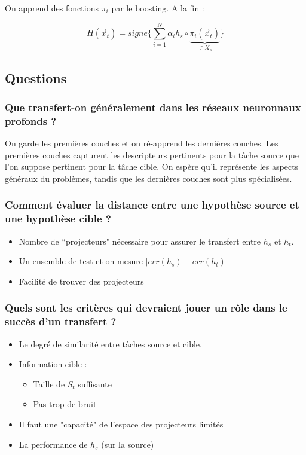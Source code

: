 \documentclass{article}
\begin{document}
On apprend des fonctions $\pi_i$ par le boosting. A la fin :

$$ H(\vec{x}_t) = signe \bigg\{ \sum_{i=1}^N \alpha_i h_s \circ \underbrace{\pi_i(\vec{x}_t)}_{\in X_s} \bigg\} $$

\subsection{Questions}

\subsubsection*{Que transfert-on généralement dans les réseaux neuronnaux profonds ?}

On garde les premières couches et on ré-apprend les dernières couches. Les premières couches capturent les descripteurs pertinents pour la tâche source que l'on suppose pertinent pour la tâche cible. On espère qu'il représente les aspects généraux du problèmes, tandis que les dernières couches sont plus spécialisées.

\subsubsection*{Comment évaluer la distance entre une hypothèse source et une hypothèse cible ?}
\begin{itemize}
\item Nombre de ``projecteurs" nécessaire pour assurer le transfert entre $h_s$ et $h_t$.
\item Un ensemble de test et on mesure $|err(h_s) - err(h_t)|$
\item Facilité de trouver des projecteurs
\end{itemize}

\subsubsection*{Quels sont les critères qui devraient jouer un rôle dans le succès d'un transfert ?}

\begin{itemize}
\item Le degré de similarité entre tâches source et cible.
\item Information cible : 
\begin{itemize}
\item Taille de $S_t$ suffisante
\item Pas trop de bruit
\end{itemize}
\item Il faut une "capacité" de l'espace des projecteurs limités
\item La performance de $h_s$ (sur la source)
\end{itemize}
\end{document}
